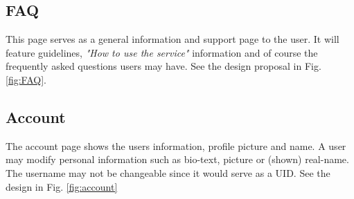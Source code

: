 \subsection*{FAQ}
This page serves as a general information and support page to the user. It will feature guidelines, \textit{"How to use the service"} information and of course the frequently asked questions users may have. See the design proposal in Fig. \ref{fig:FAQ}.


\subsection*{Account}
The account page shows the users information, profile picture and name. A user may modify personal information such as bio-text, picture or (shown) real-name. The username may not be changeable since it would serve as a UID. See the design in Fig. \ref{fig:account}

